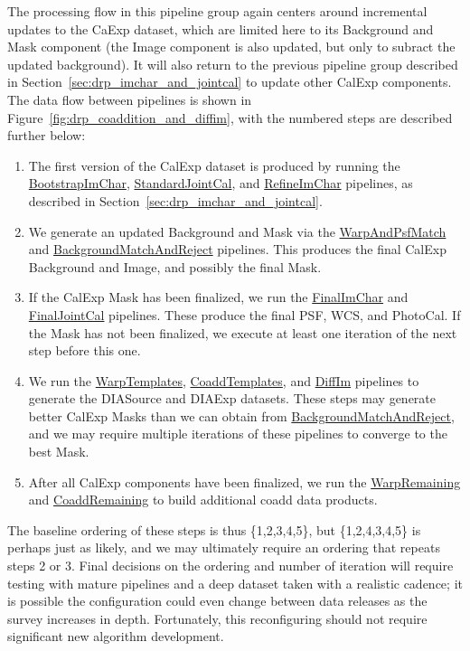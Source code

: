 The processing flow in this pipeline group again centers around incremental updates to the CaExp dataset, which are limited here to its Background and Mask component (the Image component is also updated, but only to subract the updated background).  It will also return to the previous pipeline group described in Section~\ref{sec:drp_imchar_and_jointcal} to update other CalExp components.  The data flow between pipelines is shown in Figure~\ref{fig:drp_coaddition_and_diffim}, with the numbered steps are described further below:
\begin{enumerate} %
\item The first version of the CalExp dataset is produced by running the \hyperref[sec:drpBootstrapImChar]{BootstrapImChar}, \hyperref[sec:drpStandardJointCal]{StandardJointCal}, and \hyperref[sec:drpRefineImChar]{RefineImChar} pipelines, as described in Section~\ref{sec:drp_imchar_and_jointcal}.
\item We generate an updated Background and Mask via the \hyperref[sec:drpWarpAndPsfMatch]{WarpAndPsfMatch} and \hyperref[sec:drpBackgroundMatchAndReject]{BackgroundMatchAndReject} pipelines.  This produces the final CalExp Background and Image, and possibly the final Mask.
\item If the CalExp Mask has been finalized, we run the \hyperref[sec:drpFinalImChar]{FinalImChar} and \hyperref[sec:drpFinalJointCal]{FinalJointCal} pipelines.  These produce the final PSF, WCS, and PhotoCal.  If the Mask has not been finalized, we execute at least one iteration of the next step before this one.
\item We run the \hyperref[sec:drpWarpTemplates]{WarpTemplates}, \hyperref[sec:drpCoaddTemplates]{CoaddTemplates}, and \hyperref[sec:drpDiffim]{DiffIm} pipelines to generate the DIASource and DIAExp datasets.  These steps may generate better CalExp Masks than we can obtain from \hyperref[sec:drpBackgroundMatchAndReject]{BackgroundMatchAndReject}, and we may require multiple iterations of these pipelines to converge to the best Mask.
\item After all CalExp components have been finalized, we run the \hyperref[sec:drpWarpRemaining]{WarpRemaining} and \hyperref[sec:drpCoaddRemaining]{CoaddRemaining} to build additional coadd data products.
\end{enumerate}
The baseline ordering of these steps is thus \{1,2,3,4,5\}, but \{1,2,4,3,4,5\} is perhaps just as likely, and we may ultimately require an ordering that repeats steps 2 or 3.  Final decisions on the ordering and number of iteration will require testing with mature pipelines and a deep dataset taken with a realistic cadence; it is possible the configuration could even change between data releases as the survey increases in depth.  Fortunately, this reconfiguring should not require significant new algorithm development.

